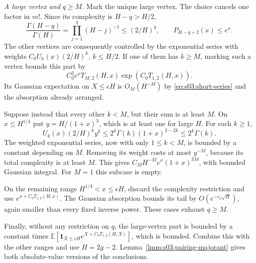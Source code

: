 \begin{prf}
\smallskip\noindent
\emph{A large vertex and $q\geq M$.}
Mark the unique large vertex. The choice cancels one factor in
$m!$. Since its complexity is $H-q>H/2$,
\[
\frac{\Gamma(H-q)}{\Gamma(H)}
=\prod_{j=1}^q(H-j)^{-1}\leq(2/H)^q,
\qquad P_{H-q+2}(x)\leq e^x.
\]
The other vertices are consequently controlled by the exponential
series with weights $C_0U_k(x)(2/H)^k$, $k\leq H/2$.
If one of them has $k\geq M$, marking such a vertex bounds this
part by
\[
C_0^2e^x T_{M,2}(H,x)\exp(C_0T_{1,2}(H,x)).
\]
Its Gaussian expectation on $X\leq\epsilon H$ is $O_M(H^{-M})$
by \eqref{eq:s03:short-series} and the absorption already arranged.

Suppose instead that every other $k<M$, but their sum is at least
$M$. On $x\leq H^{1/4}$ put $y=H/(1+x)^3$, which is at least
one for large $H$. For each $k\geq1$,
\[
U_k(x)(2/H)^ky^k
\leq2^k\Gamma(k)(1+x)^{2-2k}
\leq2^k\Gamma(k).
\]
The weighted exponential series, now with only $1\leq k<M$, is
bounded by a constant depending on $M$. Removing its weight costs
at most $y^{-M}$, because its total complexity is at least $M$.
This gives
$C_MH^{-M}e^x(1+x)^{3M}$, with bounded Gaussian integral.
For $M=1$ this subcase is empty.

On the remaining range $H^{1/4}<x\leq\epsilon H$, discard the
complexity restriction and use
$e^{x+C_0T_{1,2}(H,x)}$. The Gaussian absorption bounds its tail
by $O(e^{-c_2\sqrt H})$, again smaller than every fixed inverse
power. These cases exhaust $q\geq M$.

Finally, without any restriction on $q$, the large-vertex part is
bounded by a constant times
$\mathbb E[\mathbf1_{X\leq\epsilon H}
 e^{X+C_0T_{1,2}(H,X)}]$, which is bounded.
Combine this with the other ranges and use $H=2g-2$.
Lemma~\ref{lmm:s03:pairing-majorant} gives both absolute-value
versions of the conclusions.
\end{prf}
